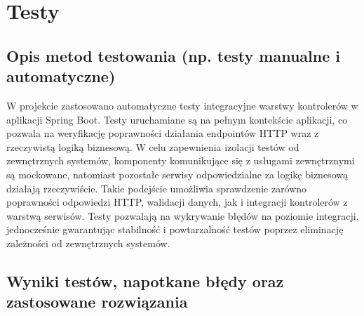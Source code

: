 \documentclass[../../spr.tex]{subfiles}
\begin{document}
\section{Testy}
\subsection{Opis metod testowania (np. testy manualne i automatyczne)}

W projekcie zastosowano automatyczne testy integracyjne warstwy kontrolerów w aplikacji Spring Boot.
Testy uruchamiane są na pełnym kontekście aplikacji,
co pozwala na weryfikację poprawności działania endpointów HTTP wraz z rzeczywistą logiką biznesową.
W celu zapewnienia izolacji testów od zewnętrznych systemów, komponenty komunikujące się z
usługami zewnętrznymi są mockowane, natomiast pozostałe serwisy odpowiedzialne za logikę biznesową
działają rzeczywiście. Takie podejście umożliwia sprawdzenie zarówno poprawności odpowiedzi HTTP,
walidacji danych, jak i integracji kontrolerów z warstwą serwisów.
Testy pozwalają na wykrywanie błędów na poziomie integracji, jednocześnie gwarantując stabilność
i powtarzalność testów poprzez eliminację zależności od zewnętrznych systemów.


\subsection{Wyniki testów, napotkane błędy oraz zastosowane rozwiązania}
\end{document}
